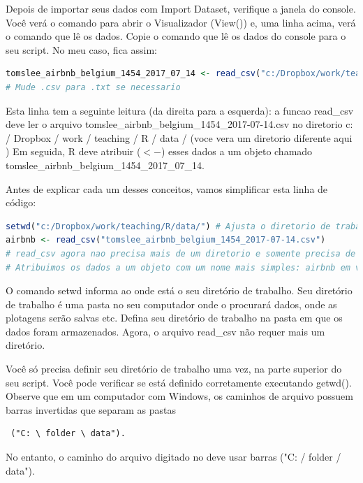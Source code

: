\documentclass{article}
\begin{document}
Depois de importar seus dados com Import Dataset, verifique a janela do console. Você verá o comando para abrir o Visualizador (View()) e, uma linha acima, verá o comando que lê os dados. Copie o comando que lê os dados do console para o seu script. No meu caso, fica assim:

\begin{lstlisting}[language=R]
tomslee_airbnb_belgium_1454_2017_07_14 <- read_csv("c:/Dropbox/work/teaching/R/data/tomslee_airbnb_belgium_1454_2017-07-14.csv") 
# Mude .csv para .txt se necessario
\end{lstlisting}

Esta linha tem a seguinte leitura (da direita para a esquerda): a funcao read\_csv deve ler o arquivo tomslee\_airbnb\_belgium\_1454\_2017-07-14.csv no diretorio c: / Dropbox / work / teaching / R / data / (voce vera um diretorio diferente aqui ) Em seguida, R deve atribuir ($<-$) esses dados a um objeto chamado tomslee\_airbnb\_belgium\_1454\_2017\_07\_14.

Antes de explicar cada um desses conceitos, vamos simplificar esta linha de código:
\begin{lstlisting}[language=R]
setwd("c:/Dropbox/work/teaching/R/data/") # Ajusta o diretorio de trabalho para onde o R precisa apontar para o arquivo .csv
airbnb <- read_csv("tomslee_airbnb_belgium_1454_2017-07-14.csv") 
# read_csv agora nao precisa mais de um diretorio e somente precisa de um nome de arquivo
# Atribuimos os dados a um objeto com um nome mais simples: airbnb em vez de tomslee_airbnb_belgium_1454_2017_07_14
\end{lstlisting}

O comando setwd informa ao \faRProject onde está o seu diretório de trabalho. Seu diretório de trabalho é uma pasta no seu computador onde o \faRProject procurará dados, onde as plotagens serão salvas etc. Defina seu diretório de trabalho na pasta em que os dados foram armazenados. Agora, o arquivo read\_csv não requer mais um diretório.

Você só precisa definir seu diretório de trabalho uma vez, na parte superior do seu script. Você pode verificar se está definido corretamente executando getwd(). Observe que em um computador com Windows, os caminhos de arquivo possuem barras invertidas que separam as pastas \begin{verbatim} ("C: \ folder \ data").\end{verbatim} 

No entanto, o caminho do arquivo digitado no \faRProject deve usar barras ("C: / folder / data").
\end{document}

